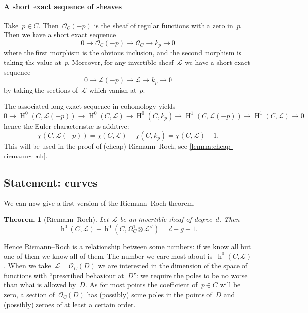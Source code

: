 \documentclass[10pt,a4paper]{article}
\theoremstyle{lecture}
\newtheorem{theorem}{Theorem}
\DeclareMathOperator\hh{h}
\DeclareMathOperator\HH{H}
\begin{document}
\paragraph{A short exact sequence of sheaves}
Take~$p\in C$. Then~$\mathcal{O}_C(-p)$ is the sheaf of regular functions with a zero in~$p$. Then we have a short exact sequence
\begin{equation}
  0\to\mathcal{O}_C(-p)\to\mathcal{O}_C\to k_p\to 0
\end{equation}
where the first morphism is the obvious inclusion, and the second morphism is taking the value at~$p$. Moreover, for any invertible sheaf~$\mathcal{L}$ we have a short exact sequence
\begin{equation}
  0\to\mathcal{L}(-p)\to\mathcal{L}\to k_p\to 0
\end{equation}
by taking the sections of~$\mathcal{L}$ which vanish at~$p$.

The associated long exact sequence in cohomology yields
\begin{equation}
  0\to\HH^0(C,\mathcal{L}(-p))\to\HH^0(C,\mathcal{L})\to\HH^0(C,k_p)\to\HH^1(C,\mathcal{L}(-p))\to\HH^1(C,\mathcal{L})\to 0
\end{equation}
hence the Euler characteristic is additive:
\begin{equation}
  \chi(C,\mathcal{L}(-p))=\chi(C,\mathcal{L})-\chi(C,k_p)=\chi(C,\mathcal{L})-1.
\end{equation}
This will be used in the proof of (cheap) Riemann--Roch, see \cref{lemma:cheap-riemann-roch}.

\subsection{Statement: curves}
\label{subsection:statement-curves}
We can now give a first version of the Riemann--Roch theorem.
\begin{theorem}[Riemann--Roch]
  \label{theorem:riemann-roch}
  Let~$\mathcal{L}$ be an invertible sheaf of degree~$d$. Then
  \begin{equation}
    \hh^0(C,\mathcal{L})-\hh^0(C,\Omega_C^1\otimes\mathcal{L}^\vee)=d-g+1.
  \end{equation}
\end{theorem}
Hence Riemann--Roch is a relationship between some numbers: if we know all but one of them we know all of them. The number we care most about is~$\hh^0(C,\mathcal{L})$. When we take~$\mathcal{L}=\mathcal{O}_C(D)$ we are interested in the dimension of the space of functions with ``prescribed behaviour at~$D$'': we require the poles to be no worse than what is allowed by~$D$. As for most points the coefficient of~$p\in C$ will be zero, a section of~$\mathcal{O}_C(D)$ has (possibly) some poles in the points of~$D$ and (possibly) zeroes of at least a certain order.
\end{document}
